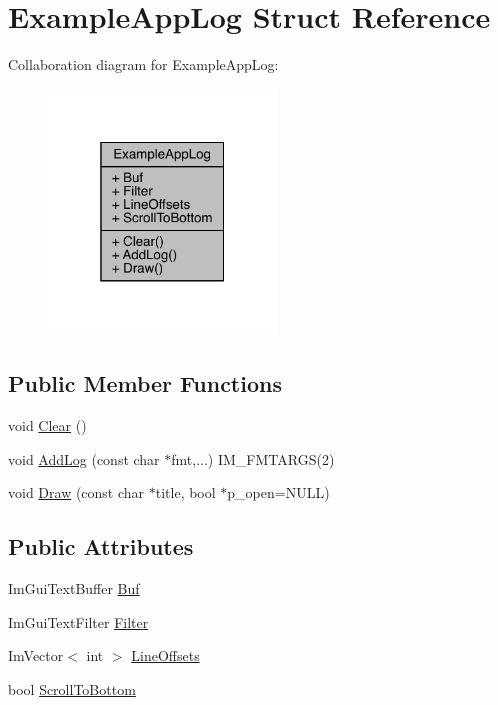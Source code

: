 \hypertarget{struct_example_app_log}{}\section{Example\+App\+Log Struct Reference}
\label{struct_example_app_log}


Collaboration diagram for Example\+App\+Log\+:
\nopagebreak
\begin{figure}[H]
\begin{center}
\leavevmode
\includegraphics[width=172pt]{d1/dc4/struct_example_app_log__coll__graph}
\end{center}
\end{figure}
\subsection*{Public Member Functions}
\begin{DoxyCompactItemize}
\item 
void \mbox{\hyperlink{struct_example_app_log_ab9c298defddbb106fdfe4ab16c5eebac}{Clear}} ()
\item 
void \mbox{\hyperlink{struct_example_app_log_afd296fb3b2559acd341fd92883f8f571}{Add\+Log}} (const char $\ast$fmt,...) I\+M\+\_\+\+F\+M\+T\+A\+R\+GS(2)
\item 
void \mbox{\hyperlink{struct_example_app_log_a5ad3a4bdb89171b84aeaff96948a1f77}{Draw}} (const char $\ast$title, bool $\ast$p\+\_\+open=N\+U\+LL)
\end{DoxyCompactItemize}
\subsection*{Public Attributes}
\begin{DoxyCompactItemize}
\item 
Im\+Gui\+Text\+Buffer \mbox{\hyperlink{struct_example_app_log_a74fb7cd7bd8c2507b41331ebb7d0e56d}{Buf}}
\item 
Im\+Gui\+Text\+Filter \mbox{\hyperlink{struct_example_app_log_a4571947a6000e984ec8da9b7166e1e2b}{Filter}}
\item 
Im\+Vector$<$ int $>$ \mbox{\hyperlink{struct_example_app_log_af197fca7116f9033a5a5e831ee764ee2}{Line\+Offsets}}
\item 
bool \mbox{\hyperlink{struct_example_app_log_a6834b71563c0595e67b78afb6c7ce39d}{Scroll\+To\+Bottom}}
\end{DoxyCompactItemize}


